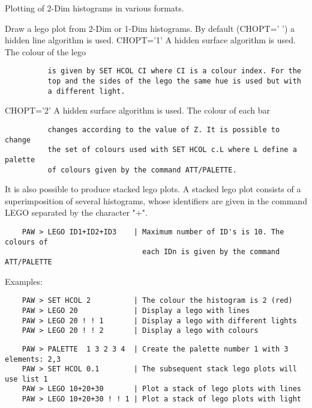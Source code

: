 \BEGTEXT
Plotting of 2-Dim histograms in various formats.
\ENDTEXT

\BEGARG
{}
\ENDARG
\BEGTEXT
Draw a lego plot from 2-Dim or 1-Dim histograms.
By default (CHOPT=' ') a hidden line algorithm is used.
CHOPT='1' A hidden surface algorithm is used. The colour of the lego
\begin{verbatim}
          is given by SET HCOL CI where CI is a colour index. For the
          top and the sides of the lego the same hue is used but with
          a different light.
\end{verbatim}
CHOPT='2' A hidden surface algorithm is used. The colour of each bar
\begin{verbatim}
          changes according to the value of Z. It is possible to change
          the set of colours used with SET HCOL c.L where L define a palette
          of colours given by the command ATT/PALETTE.
\end{verbatim}
It is also possible to produce stacked lego plots. A stacked lego plot
consists of a superimposition of several histograms, whose identifiers are
given in the command LEGO separated by the character "+".

\begin{verbatim}
    PAW > LEGO ID1+ID2+ID3    | Maximum number of ID's is 10. The colours of
                                each IDn is given by the command ATT/PALETTE
\end{verbatim}
Examples:

\begin{verbatim}
    PAW > SET HCOL 2          | The colour the histogram is 2 (red)
    PAW > LEGO 20             | Display a lego with lines
    PAW > LEGO 20 ! ! 1       | Display a lego with different lights
    PAW > LEGO 20 ! ! 2       | Display a lego with colours
\end{verbatim}

\begin{verbatim}
    PAW > PALETTE  1 3 2 3 4  | Create the palette number 1 with 3 elements: 2,3
    PAW > SET HCOL 0.1        | The subsequent stack lego plots will use list 1
    PAW > LEGO 10+20+30       | Plot a stack of lego plots with lines
    PAW > LEGO 10+20+30 ! ! 1 | Plot a stack of lego plots with light
\end{verbatim}

